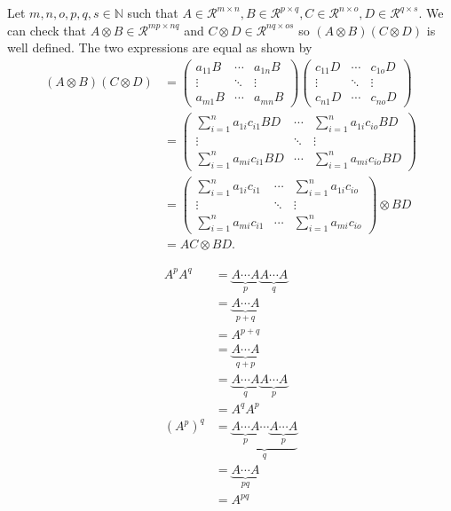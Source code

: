 \begin{solution}
  Let $m,n,o,p,q,s \in \mathbb{N}$ such that
  $A \in \mathcal{R}^{m \times n}, B \in \mathcal{R}^{p \times q}, C \in \mathcal{R}^{n \times o}, D \in \mathcal{R}^{q \times s}$.
  We can check that
  $A \otimes B \in \mathcal{R}^{mp \times nq}$ and
  $C \otimes D \in \mathcal{R}^{nq \times os}$
  so $(A \otimes B) (C \otimes D)$ is well defined.
  The two expressions are equal as shown by
  \begin{align*}
    (A \otimes B) (C \otimes D)
    & =
    \begin{pmatrix}
      a_{11}B & \cdots & a_{1n}B\\
      \vdots  & \ddots & \vdots\\
      a_{m1}B & \cdots & a_{mn}B
    \end{pmatrix}
    \begin{pmatrix}
      c_{11}D & \cdots & c_{1o}D\\
      \vdots  & \ddots & \vdots\\
      c_{n1}D & \cdots & c_{no}D
    \end{pmatrix}\\
    & =
    \begin{pmatrix}
      \sum_{i=1}^n a_{1i}c_{i1}BD & \cdots & \sum_{i=1}^n a_{1i}c_{io}BD\\
      \vdots  & \ddots & \vdots\\
      \sum_{i=1}^n a_{mi}c_{i1}BD & \cdots & \sum_{i=1}^n a_{mi}c_{io}BD
    \end{pmatrix}\\
    & =
    \begin{pmatrix}
      \sum_{i=1}^n a_{1i}c_{i1} & \cdots & \sum_{i=1}^n a_{1i}c_{io}\\
      \vdots  & \ddots & \vdots\\
      \sum_{i=1}^n a_{mi}c_{i1} & \cdots & \sum_{i=1}^n a_{mi}c_{io}
    \end{pmatrix}
    \otimes BD\\
    & =
    AC \otimes BD.
  \end{align*}
\end{solution}

\begin{solution}
  \begin{align*}
    A^pA^q
    & = \underbrace{A \cdots A}_{p} \underbrace{A \cdots A}_{q}\\
    & = \underbrace{A \cdots A}_{p+q}\\
    & = A^{p+q}\\
    & = \underbrace{A \cdots A}_{q+p}\\
    & = \underbrace{A \cdots A}_{q} \underbrace{A \cdots A}_{p}\\
    & = A^qA^p\\
    (A^p)^q
    & = \underbrace{\underbrace{A \cdots A}_{p} \cdots \underbrace{A \cdots A}_{p}}_q\\
    & = \underbrace{A \cdots A}_{pq}\\
    & = A^{pq}
  \end{align*}
\end{solution}

